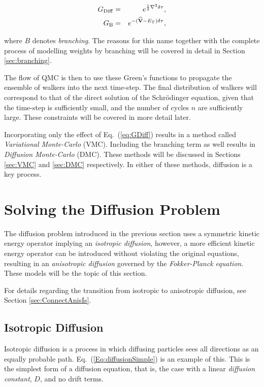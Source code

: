 \begin{eqnarray}
 G_\mathrm{Diff} &=& e^{\frac{1}{2}\nabla^2\delta\tau},\label{eq:GDiff} \\
 G_\mathrm{B} &=& e^{-({\bf\widehat{V}} - E_T)\delta\tau} \label{eq:GB},
\end{eqnarray}

where $B$ denotes \textit{branching}. The reasons for this name together with the complete process of modelling weights by branching will be covered in detail in Section \ref{sec:branching}.

The flow of QMC is then to use these Green's functions to propagate the ensemble of walkers into the next time-step. The final distribution of walkers will correspond to that of the direct solution of the Schrödinger equation, given that the time-step is sufficiently small, and the number of cycles $n$ are sufficiently large. These constraints will be covered in more detail later. 

Incorporating only the effect of Eq.~(\ref{eq:GDiff}) results in a method called \textit{Variational Monte-Carlo} (VMC). Including the branching term as well results in \textit{Diffusion Monte-Carlo} (DMC). These methods will be discussed in Sections \ref{sec:VMC} and \ref{sec:DMC} respectively. In either of these methods, diffusion is a key process.

\section{Solving the Diffusion Problem}

The diffusion problem introduced in the previous section uses a symmetric kinetic energy operator implying an \textit{isotropic diffusion}, however, a more efficient kinetic energy operator can be introduced without violating the original equations, resulting in an \textit{anisotropic diffusion} governed by the \textit{Fokker-Planck equation}. These models will be the topic of this section. 

For details regarding the transition from isotropic to anisotropic diffusion, see Section \ref{sec:ConnectAnisIs}.

\subsection{Isotropic Diffusion}

Isotropic diffusion is a process in which diffusing particles sees all directions as an equally probable path. Eq.~(\ref{Eq:diffusionSimple}) is an example of this. This is the simplest form of a diffusion equation, that is, the case with a linear \textit{diffusion constant}, $D$, and no drift terms.

